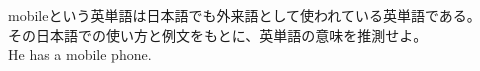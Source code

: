 \documentclass{jarticle}
\begin{document}
\vspace*{\fill}
\begin{center}
mobileという英単語は日本語でも外来語として使われている英単語である。\\
その日本語での使い方と例文をもとに、英単語の意味を推測せよ。\\
He has a mobile phone.
\end{center}
\vspace*{\fill}
\end{document}
